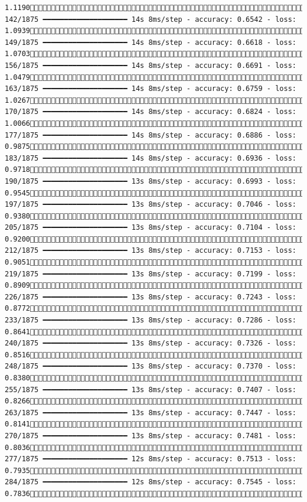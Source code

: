 \documentclass[
  letterpaper,
  DIV=11,
  numbers=noendperiod]{scrreprt}
\begin{document}
\begin{verbatim}
1.1190 142/1875 ━━━━━━━━━━━━━━━━━━━━ 14s 8ms/step - accuracy: 0.6542 - loss: 1.0939 149/1875 ━━━━━━━━━━━━━━━━━━━━ 14s 8ms/step - accuracy: 0.6618 - loss: 1.0703 156/1875 ━━━━━━━━━━━━━━━━━━━━ 14s 8ms/step - accuracy: 0.6691 - loss: 1.0479 163/1875 ━━━━━━━━━━━━━━━━━━━━ 14s 8ms/step - accuracy: 0.6759 - loss: 1.0267 170/1875 ━━━━━━━━━━━━━━━━━━━━ 14s 8ms/step - accuracy: 0.6824 - loss: 1.0066 177/1875 ━━━━━━━━━━━━━━━━━━━━ 14s 8ms/step - accuracy: 0.6886 - loss: 0.9875 183/1875 ━━━━━━━━━━━━━━━━━━━━ 14s 8ms/step - accuracy: 0.6936 - loss: 0.9718 190/1875 ━━━━━━━━━━━━━━━━━━━━ 13s 8ms/step - accuracy: 0.6993 - loss: 0.9545 197/1875 ━━━━━━━━━━━━━━━━━━━━ 13s 8ms/step - accuracy: 0.7046 - loss: 0.9380 205/1875 ━━━━━━━━━━━━━━━━━━━━ 13s 8ms/step - accuracy: 0.7104 - loss: 0.9200 212/1875 ━━━━━━━━━━━━━━━━━━━━ 13s 8ms/step - accuracy: 0.7153 - loss: 0.9051 219/1875 ━━━━━━━━━━━━━━━━━━━━ 13s 8ms/step - accuracy: 0.7199 - loss: 0.8909 226/1875 ━━━━━━━━━━━━━━━━━━━━ 13s 8ms/step - accuracy: 0.7243 - loss: 0.8772 233/1875 ━━━━━━━━━━━━━━━━━━━━ 13s 8ms/step - accuracy: 0.7286 - loss: 0.8641 240/1875 ━━━━━━━━━━━━━━━━━━━━ 13s 8ms/step - accuracy: 0.7326 - loss: 0.8516 248/1875 ━━━━━━━━━━━━━━━━━━━━ 13s 8ms/step - accuracy: 0.7370 - loss: 0.8380 255/1875 ━━━━━━━━━━━━━━━━━━━━ 13s 8ms/step - accuracy: 0.7407 - loss: 0.8266 263/1875 ━━━━━━━━━━━━━━━━━━━━ 13s 8ms/step - accuracy: 0.7447 - loss: 0.8141 270/1875 ━━━━━━━━━━━━━━━━━━━━ 13s 8ms/step - accuracy: 0.7481 - loss: 0.8036 277/1875 ━━━━━━━━━━━━━━━━━━━━ 12s 8ms/step - accuracy: 0.7513 - loss: 0.7935 284/1875 ━━━━━━━━━━━━━━━━━━━━ 12s 8ms/step - accuracy: 0.7545 - loss: 0.7836 
\end{verbatim}
\end{document}
